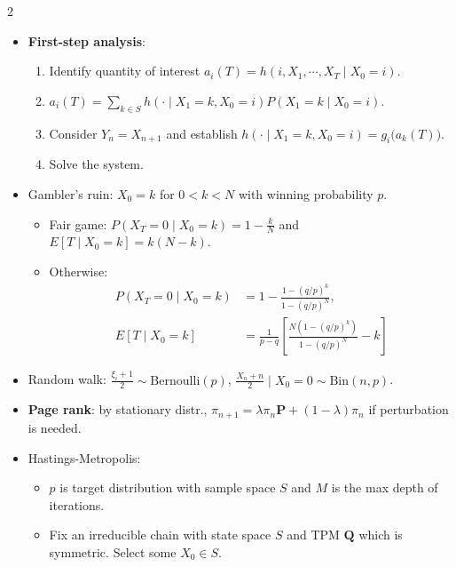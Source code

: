 \documentclass[8pt]{article}
\begin{document}
\begin{multicols*}{2}
\begin{itemize}
\begin{align*}
            \end{align*}
            \item \textbf{First-step analysis}:
            \begin{enumerate}
                \item Identify quantity of interest $a_i\left(T\right) = h\left(i, X_1, \cdots, X_T \mid X_0 = i\right)$.
                \item $a_i\left(T\right) = \sum_{k \in S}h\left(\cdot \mid X_1 = k, X_0 = i\right)P\left(X_1 = k \mid X_0 = i\right)$.
                \item Consider $Y_n = X_{n + 1}$ and establish $h\left(\cdot \mid X_1 = k, X_0 = i\right) = g_i\bigl(a_k\left(T\right)\bigr)$.
                \item Solve the system.
            \end{enumerate}
            \item Gambler's ruin: $X_0 = k$ for $0 < k < N$ with winning probability $p$.
            \begin{itemize}
                \item Fair game: $P\left(X_T = 0 \mid X_0 = k\right) = 1 - \frac{k}{N}$ and $E\left[T \mid X_0 = k\right] = k\left(N - k\right)$.
                \item Otherwise: 
                \begin{align*}
                    P\left(X_T = 0 \mid X_0 = k\right) & = 1 - \frac{1 - \left(q / p\right)^k}{1 - \left(q / p\right)^N}, \\
                    E\left[T \mid X_0 = k\right] & = \frac{1}{p - q}\left[\frac{N\left(1 - \left(q / p\right)^k\right)}{1 - \left(q / p\right)^N} - k\right]
                \end{align*}
            \end{itemize}
            \item Random walk: $\frac{\xi_i + 1}{2} \sim \mathrm{Bernoulli}\left(p\right)$, $\frac{X_n + n}{2} \mid X_0 = 0 \sim \mathrm{Bin}\left(n, p\right)$.
            \item \textbf{Page rank}: by stationary distr., $\pi_{n + 1} = \lambda\pi_n\bm{P} + (1 - \lambda)\pi_n$ if perturbation is needed.
            \item Hastings-Metropolis: 
            \begin{itemize}
                \item $p$ is target distribution with sample space $S$ and $M$ is the max depth of iterations.
                \item Fix an irreducible chain with state space $S$ and TPM $\bm{Q}$ which is symmetric. Select some $X_0 \in S$.

\end{itemize}
\end{itemize}
\end{multicols*}
\end{document}
